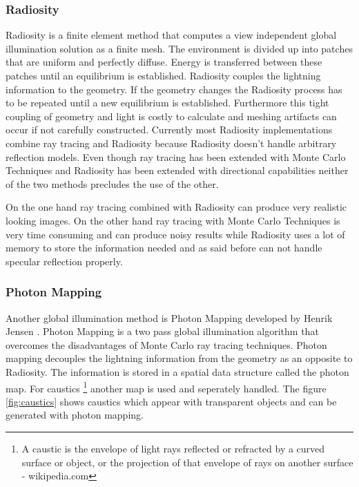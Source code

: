 \documentclass[DIV10, abstracton, openright, footsepline, headsepline, twoside, 9pt,
bigheadings]{scrreprt}
\begin{document}
\subsubsection*{Radiosity}
Radiosity \cite{Shirley00} is a finite element method that computes a view
independent global illumination solution as a finite mesh. The environment is
divided up into patches that are uniform and perfectly diffuse. Energy is
transferred between these patches until an equilibrium is established.
Radiosity couples the lightning information to the geometry. If the geometry
changes the Radiosity process has to be repeated until a new equilibrium is
established. Furthermore this tight coupling of geometry and light is costly to
calculate and meshing artifacts can occur if not carefully constructed.
Currently most Radiosity implementations combine ray tracing and Radiosity
\cite{ProMulltGI91} \cite{Shirley90} \cite{ZimmerShirley95} because Radiosity
doesn't handle arbitrary reflection models. Even though ray tracing has been
extended with Monte Carlo Techniques and Radiosity has been extended with
directional capabilities neither of the two methods precludes the use of the
other.

On the one hand ray tracing combined with Radiosity can produce very realistic
looking images. On the other hand ray tracing with Monte Carlo Techniques is
very time consuming and can produce noisy results while Radiosity uses a lot of
memory to store the information needed and as said before can not handle
specular reflection properly.

\subsubsection*{Photon Mapping}
Another global illumination method is Photon Mapping developed by Henrik Jensen
\cite{Henrik96}. Photon Mapping is a two pass global illumination algorithm
that overcomes the disadvantages of Monte Carlo ray tracing techniques. Photon
mapping decouples the lightning information from the geometry as an opposite to
Radiosity. The information is stored in a spatial data structure called the
photon map. For caustics \cite{Wiki06} \footnote{A caustic is the envelope of
light rays
reflected or refracted by a curved surface or object, or the projection of that
envelope of rays on another surface - wikipedia.com} another map is used and
seperately handled. The figure \ref{fig:caustics} shows caustics which appear
with transparent objects and can be generated with photon mapping.
\end{document}
